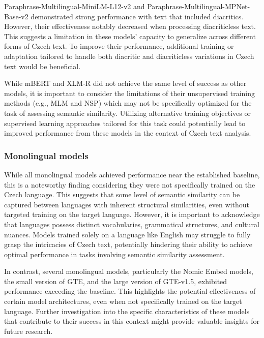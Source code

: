 Paraphrase-Multilingual-MiniLM-L12-v2 and Paraphrase-Multilingual-MPNet-Base-v2 demonstrated strong performance with text that included diacritics.
However, their effectiveness notably decreased when processing diacriticless text.
This suggests a limitation in these models' capacity to generalize across different forms of Czech text.
To improve their performance, additional training or adaptation tailored to handle both diacritic and diacriticless variations in Czech text would be beneficial.

While \ac{mBERT} and \ac{XLM-R} did not achieve the same level of success as other models, it is important to consider the limitations of their unsupervised training methods (e.g., \ac{MLM} and \ac{NSP}) which may not be specifically optimized for the task of assessing semantic similarity.
Utilizing alternative training objectives or supervised learning approaches tailored for this task could potentially lead to improved performance from these models in the context of Czech text analysis.

\subsubsection{Monolingual models}

While all monolingual models achieved performance near the established baseline, this is a noteworthy finding considering they were not specifically trained on the Czech language.
This suggests that some level of semantic similarity can be captured between languages with inherent structural similarities, even without targeted training on the target language.
However, it is important to acknowledge that languages possess distinct vocabularies, grammatical structures, and cultural nuances.
Models trained solely on a language like English may struggle to fully grasp the intricacies of Czech text, potentially hindering their ability to achieve optimal performance in tasks involving semantic similarity assessment.

In contrast, several monolingual models, particularly the Nomic Embed models, the small version of \ac{GTE}, and the large version of \ac{GTE}-v1.5, exhibited performance exceeding the baseline.
This highlights the potential effectiveness of certain model architectures, even when not specifically trained on the target language.
Further investigation into the specific characteristics of these models that contribute to their success in this context might provide valuable insights for future research.

